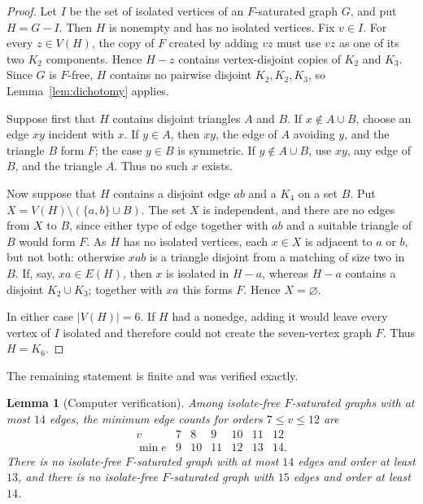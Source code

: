 \documentclass[11pt]{amsart}
\newtheorem{lemma}[theorem]{Lemma}
\begin{document}
\begin{proof}
Let $I$ be the set of isolated vertices of an $F$-saturated graph $G$, and put
$H=G-I$. Then $H$ is nonempty and has no isolated vertices. Fix $v\in I$. For
every $z\in V(H)$, the copy of $F$ created by adding $vz$ must use $vz$ as one
of its two $K_2$ components. Hence $H-z$ contains vertex-disjoint copies of
$K_2$ and $K_3$. Since $G$ is $F$-free, $H$ contains no pairwise disjoint
$K_2,K_2,K_3$, so Lemma~\ref{lem:dichotomy} applies.

Suppose first that $H$ contains disjoint triangles $A$ and $B$. If
$x\notin A\cup B$, choose an edge $xy$ incident with $x$. If $y\in A$, then
$xy$, the edge of $A$ avoiding $y$, and the triangle $B$ form $F$; the case
$y\in B$ is symmetric. If $y\notin A\cup B$, use $xy$, any edge of $B$, and
the triangle $A$. Thus no such $x$ exists.

Now suppose that $H$ contains a disjoint edge $ab$ and a $K_4$ on a set $B$.
Put $X=V(H)\setminus(\{a,b\}\cup B)$. The set $X$ is independent, and there
are no edges from $X$ to $B$, since either type of edge together with $ab$ and
a suitable triangle of $B$ would form $F$. As $H$ has no isolated vertices,
each $x\in X$ is adjacent to $a$ or $b$, but not both: otherwise $xab$ is a
triangle disjoint from a matching of size two in $B$. If, say, $xa\in E(H)$,
then $x$ is isolated in $H-a$, whereas $H-a$ contains a disjoint
$K_2\cup K_3$; together with $xa$ this forms $F$. Hence $X=\varnothing$.

In either case $|V(H)|=6$. If $H$ had a nonedge, adding it would leave every
vertex of $I$ isolated and therefore could not create the seven-vertex graph
$F$. Thus $H=K_6$.
\end{proof}

The remaining statement is finite and was verified exactly.

\begin{lemma}[Computer verification]\label{lem:computer}
Among isolate-free $F$-saturated graphs with at most $14$ edges, the minimum
edge counts for orders $7\le v\le12$ are
\[
\begin{array}{c|rrrrrr}
v&7&8&9&10&11&12\\ \hline
\min e&9&10&11&12&13&14.
\end{array}
\]
There is no isolate-free $F$-saturated graph with at most $14$ edges and order
at least $13$, and there is no isolate-free $F$-saturated graph with $15$ edges
and order at least $14$.
\end{lemma}
\end{document}
